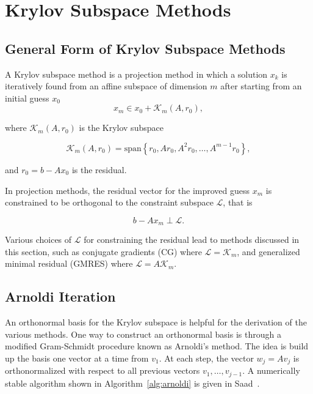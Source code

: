 \chapter{Krylov Subspace Methods}
\label{chapter:KrylovSolvers}
\section{General Form of Krylov Subspace Methods}
A Krylov subspace method is a projection method in which a solution $x_k$ is iteratively found from an affine subspace of dimension $m$ after starting from an initial guess $x_0$
\begin{equation}
    x_m \in x_0 + \mathcal{K}_m(A, r_0),
\end{equation}

where $\mathcal{K}_m(A, r_0)$ is the Krylov subspace

\begin{equation}
    \mathcal{K}_m(A, r_0) = \text{span}\left\{r_0, Ar_0, A^2r_0, \ldots, A^{m-1}r_0 \right\},
\end{equation}

and $r_0 = b - Ax_0$ is the residual.

In projection methods, the residual vector for the improved guess $x_m$ is constrained to be orthogonal to the constraint subspace $\mathcal{L}$, that is

\begin{equation}
    \label{eq:constraint_space}
    b - Ax_m \perp \mathcal{L}.
\end{equation}

Various choices of $\mathcal{L}$ for constraining the residual lead to methods discussed in this section, such as conjugate gradients (CG) where $\mathcal{L} = \mathcal{K}_m$, and generalized minimal residual (GMRES) where $\mathcal{L} = A\mathcal{K}_m$.

\section{Arnoldi Iteration}
An orthonormal basis for the Krylov subspace is helpful for the derivation of the various methods. One way to construct an orthonormal basis is through a modified Gram-Schmidt procedure known as Arnoldi's method. The idea is build up the basis one vector at a time from $v_1$. At each step, the vector $w_j = Av_j$ is orthonormalized with respect to all previous vectors $v_1, \ldots, v_{j-1}$. A numerically stable algorithm shown in Algorithm~\ref{alg:arnoldi} is given in Saad~\cite{Saad2003}.


